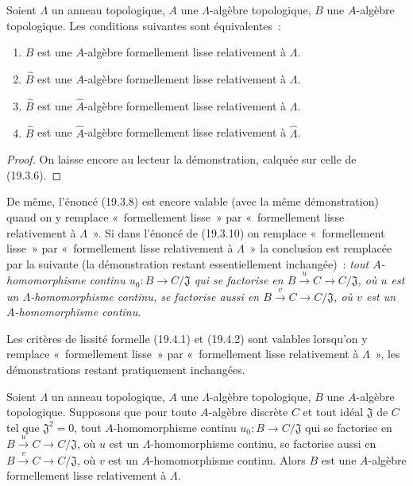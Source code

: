 \begin{proposition}[19.9.4]
\label{0.19.9.4-fr}
Soient $\Lambda$ un anneau topologique, $A$ une $\Lambda$-algèbre topologique,
$B$ une $A$-algèbre topologique. Les conditions suivantes sont équivalentes~:
\begin{enumerate}
  \item[\textup{a)}] $B$ est une $A$-algèbre formellement lisse relativement à
  $\Lambda$.
  \item[\textup{b)}] $\widehat B$ est une $A$-algèbre formellement lisse relativement à
  $\Lambda$.
  \item[\textup{c)}] $\widehat B$ est une $\widehat A$-algèbre formellement lisse
  relativement à $\Lambda$.
  \item[\textup{d)}] $\widehat B$ est une $\widehat A$-algèbre formellement lisse
  relativement à $\widehat\Lambda$.
\end{enumerate}
\end{proposition}

\begin{proof}
On laisse encore au lecteur la démonstration, calquée sur celle de (19.3.6).
\end{proof}


\begin{env}[19.9.5]
\label{0.19.9.5-fr}
De même, l'énoncé (19.3.8) est encore valable (avec la même démonstration) quand
on y remplace «~formellement lisse~» par «~formellement lisse relativement à
$\Lambda$~». Si dans l'énoncé de (19.3.10) on remplace «~formellement lisse~»
par «~formellement lisse relativement à $\Lambda$~» la conclusion est remplacée
par la suivante (la démonstration restant essentiellement inchangée)~: \emph{tout
$A$-homomorphisme continu $u_0:B\to C/\mathfrak J$ qui se factorise en
$B\xrightarrow{u}C\to C/\mathfrak J$, où $u$ est un $\Lambda$-homomorphisme
continu, se factorise aussi en $B\xrightarrow{v}C\to C/\mathfrak J$, où $v$
est un $A$-homomorphisme continu}.
\end{env}

\begin{env}[19.9.6]
\label{0.19.9.6-fr}
Les critères de lissité formelle (19.4.1) et (19.4.2) sont valables lorsqu'on y
remplace «~formellement lisse~» par «~formellement lisse relativement à
$\Lambda$~», les démonstrations restant pratiquement inchangées.
\end{env}

\begin{proposition}[19.9.7]
\label{0.19.9.7-fr}
Soient $\Lambda$ un anneau topologique, $A$ une $\Lambda$-algèbre topologique,
$B$ une $A$-algèbre topologique. Supposons que pour toute $A$-algèbre discrète
$C$ et tout idéal $\mathfrak J$ de $C$ tel que $\mathfrak J^2=0$, tout
$A$-homomorphisme continu $u_0:B\to C/\mathfrak J$ qui se factorise en
$B\xrightarrow{u}C\to C/\mathfrak J$, où $u$ est un $\Lambda$-homomorphisme
continu, se factorise aussi en $B\xrightarrow{v}C\to C/\mathfrak J$, où $v$
est un $A$-homomorphisme continu. Alors $B$ est une $A$-algèbre formellement
lisse relativement à $\Lambda$.
\end{proposition}

